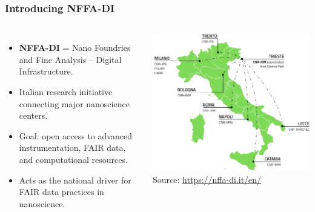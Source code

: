 \documentclass{beamer}
\begin{document}
	\begin{frame}
		\frametitle{Introducing NFFA-DI}
		\begin{columns}[T,totalwidth=\textwidth]
			\begin{itemize}
				\item \textbf{NFFA-DI} = Nano Foundries and Fine Analysis – Digital Infrastructure.
				\item Italian research initiative connecting major nanoscience centers.
				\item Goal: open access to advanced instrumentation, FAIR data, and computational resources.
				\item Acts as the national driver for FAIR data practices in nanoscience.
			\end{itemize}
			\includegraphics[width=\textwidth]{otherResources/NFFA_map.png} %
			\vspace{2em}
			\tiny Source: \url{https://nffa-di.it/en/}
		\end{columns}
	\end{frame}
	
\end{document}
